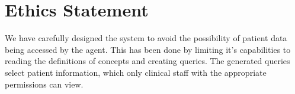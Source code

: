 \documentclass[11pt]{article}
\begin{document}
\section{Ethics Statement}
We have carefully designed the system to avoid the possibility of patient data being accessed by the agent.
This has been done by limiting it's capabilities to reading the definitions of concepts and creating queries.
The generated queries select patient information, which only clinical staff with the appropriate permissions can view.




\end{document}
